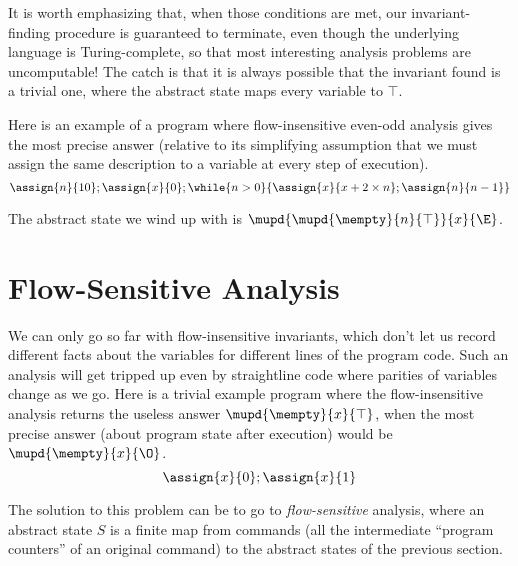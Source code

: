 \documentclass{amsbook}
\theoremstyle{definition}
\theoremstyle{remark}
\numberwithin{section}{chapter}
\numberwithin{equation}{chapter}
\begin{document}
It is worth emphasizing that, when those conditions are met, our invariant-finding procedure is guaranteed to terminate, even though the underlying language is Turing-complete, so that most interesting analysis problems are uncomputable!
The catch is that it is always possible that the invariant found is a trivial one, where the abstract state maps every variable to $\top$.

Here is an example of a program where flow-insensitive even-odd analysis gives the most precise answer (relative to its simplifying assumption that we must assign the same description to a variable at every step of execution).
$$\assign{n}{10}; \assign{x}{0}; \while{n > 0}{\assign{x}{x + 2 \times n}; \assign{n}{n - 1}}$$

The abstract state we wind up with is $\mupd{\mupd{\mempty}{n}{\top}}{x}{\E}$.

\section{Flow-Sensitive Analysis}

We can only go so far with flow-insensitive invariants, which don't let us record different facts about the variables for different lines of the program code.
Such an analysis will get tripped up even by straightline code where parities of variables change as we go.
Here is a trivial example program where the flow-insensitive analysis returns the useless answer $\mupd{\mempty}{x}{\top}$, when the most precise answer (about program state after execution) would be $\mupd{\mempty}{x}{\O}$.
$$\assign{x}{0}; \assign{x}{1}$$

The solution to this problem can be to go to \emph{flow-sensitive} analysis, where an abstract state $S$ is a finite map from commands (all the intermediate ``program counters'' of an original command) to the abstract states of the previous section.

\newcommand{\absstep}[3]{\mathcal S(#1, #2, #3)}
\newcommand{\absstepo}[2]{\mathcal S(#1, #2)}
\end{document}
